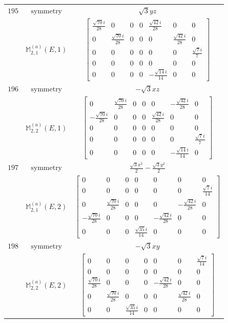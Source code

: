 \documentclass[fleqn,8pt,landscape]{jsarticle}
\begin{document}
\begin{longtable}{ccc}
$ 195 $ & $ \text{symmetry} $ & $ \sqrt{3} y z $ \\
$  $ & $ \mathbb{M}_{2,1}^{(a)}(E,1) $ & $ \begin{bmatrix} \frac{\sqrt{70} i}{28} & 0 & 0 & 0 & \frac{\sqrt{42} i}{28} & 0 & 0 \\ 0 & \frac{\sqrt{70} i}{28} & 0 & 0 & 0 & \frac{\sqrt{42} i}{28} & 0 \\ 0 & 0 & 0 & 0 & 0 & 0 & \frac{\sqrt{7} i}{7} \\ 0 & 0 & 0 & 0 & 0 & 0 & 0 \\ 0 & 0 & 0 & 0 & - \frac{\sqrt{14} i}{14} & 0 & 0 \end{bmatrix} $ \\ \hline
$ 196 $ & $ \text{symmetry} $ & $ - \sqrt{3} x z $ \\
$  $ & $ \mathbb{M}_{2,2}^{(a)}(E,1) $ & $ \begin{bmatrix} 0 & \frac{\sqrt{70} i}{28} & 0 & 0 & 0 & - \frac{\sqrt{42} i}{28} & 0 \\ - \frac{\sqrt{70} i}{28} & 0 & 0 & 0 & \frac{\sqrt{42} i}{28} & 0 & 0 \\ 0 & 0 & 0 & 0 & 0 & 0 & 0 \\ 0 & 0 & 0 & 0 & 0 & 0 & \frac{\sqrt{7} i}{7} \\ 0 & 0 & 0 & 0 & 0 & - \frac{\sqrt{14} i}{14} & 0 \end{bmatrix} $ \\ \hline
$ 197 $ & $ \text{symmetry} $ & $ \frac{\sqrt{3} x^{2}}{2} - \frac{\sqrt{3} y^{2}}{2} $ \\
$  $ & $ \mathbb{M}_{2,1}^{(a)}(E,2) $ & $ \begin{bmatrix} 0 & 0 & 0 & 0 & 0 & 0 & 0 \\ 0 & 0 & 0 & 0 & 0 & 0 & \frac{\sqrt{7} i}{14} \\ 0 & \frac{\sqrt{70} i}{28} & 0 & 0 & 0 & - \frac{\sqrt{42} i}{28} & 0 \\ - \frac{\sqrt{70} i}{28} & 0 & 0 & 0 & - \frac{\sqrt{42} i}{28} & 0 & 0 \\ 0 & 0 & 0 & \frac{\sqrt{35} i}{14} & 0 & 0 & 0 \end{bmatrix} $ \\ \hline
$ 198 $ & $ \text{symmetry} $ & $ - \sqrt{3} x y $ \\
$  $ & $ \mathbb{M}_{2,2}^{(a)}(E,2) $ & $ \begin{bmatrix} 0 & 0 & 0 & 0 & 0 & 0 & \frac{\sqrt{7} i}{14} \\ 0 & 0 & 0 & 0 & 0 & 0 & 0 \\ \frac{\sqrt{70} i}{28} & 0 & 0 & 0 & - \frac{\sqrt{42} i}{28} & 0 & 0 \\ 0 & \frac{\sqrt{70} i}{28} & 0 & 0 & 0 & \frac{\sqrt{42} i}{28} & 0 \\ 0 & 0 & \frac{\sqrt{35} i}{14} & 0 & 0 & 0 & 0 \end{bmatrix} $ \\ \hline

\end{longtable}
\end{document}

